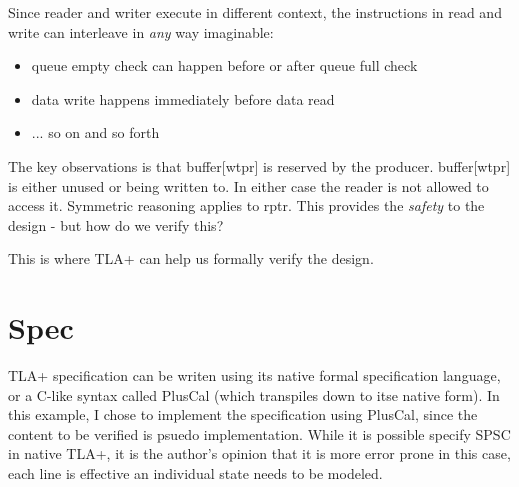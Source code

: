 \documentclass{report}
\begin{document}
Since reader and writer execute in different context, the instructions in read
and write can interleave in \textit{any} way imaginable:
\begin{itemize}
    \item queue empty check can happen before or after queue full check
    \item data write happens immediately before data read
    \item ... so on and so forth
\end{itemize}

The key observations is that buffer[wtpr] is reserved by the producer.
buffer[wtpr] is either unused or being written to. In either case the reader is
not allowed to access it. Symmetric reasoning applies to rptr. This provides
the \textit{safety} to the design - but how do we verify this?\newline

This is where TLA+ can help us formally verify the design.

\section{Spec}

TLA+ specification can be writen using its native formal specification
language, or a C-like syntax called PlusCal (which transpiles down to itse
native form). In this example, I chose to implement the specification using
PlusCal, since the content to be verified is psuedo implementation. While it is
possible specify SPSC in native TLA+, it is the author's opinion that it is
more error prone in this case, each line is effective an individual state needs
to be modeled.\newline
\end{document}
